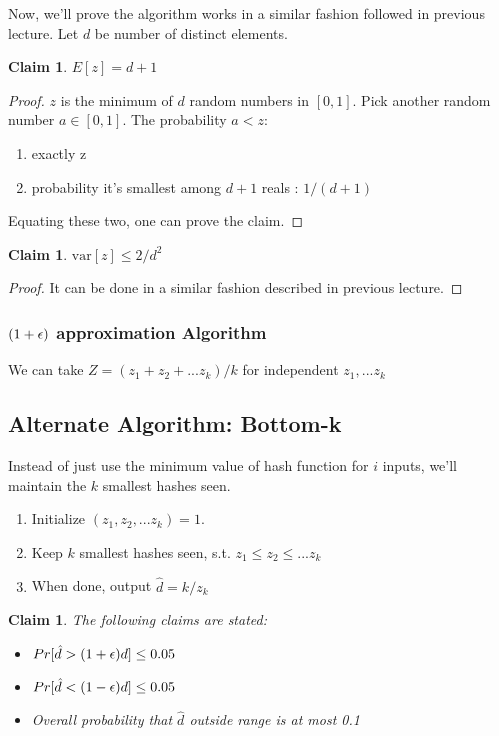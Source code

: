 \documentclass[11pt]{article}
\newtheorem{claim}[theorem]{Claim}
\def\eps{\ensuremath\epsilon}
\begin{document}
Now, we'll prove the algorithm works in a similar fashion followed in previous lecture.
Let $d$ be number of distinct elements.

\begin{claim}
$E[z] = d+1$
\end{claim}

\begin{proof}
$z$ is the minimum of $d$ random numbers in $[0,1]$. Pick another random number $a \in [0,1]$. The probability $a<z$:
\begin{enumerate}
\item exactly z
\item probability it's smallest among $d+1$ reals : $1/(d+1)$
\end{enumerate}
Equating these two, one can prove the claim.
\end{proof}

\begin{claim}
$\text{var}[z] \leq 2/d^{2}$
\end{claim}

\begin{proof}
It can be done in a similar fashion described in previous lecture.
\end{proof}

\subsubsection{$(1+\eps)$ approximation Algorithm }
We can take $Z = (z_{1} + z_{2} + ... z_{k})/k$ for independent $z_{1}, ... z_{k}$

\subsection{Alternate Algorithm: Bottom-k}
Instead of just use the minimum value of hash function for $i$ inputs, we'll maintain the $k$ smallest hashes seen.
\begin{enumerate}
\item Initialize $(z_{1}, z_{2},...z_{k}) = 1$.
\item Keep $k$ smallest hashes seen, s.t. $z_{1}\leq z_{2}\leq...z_{k}$
\item When done, output $\hat{d} = k/z_{k}$
\end{enumerate}

\begin{claim}
The following claims are stated:
\begin{itemize}
\item $Pr[\hat{d} > (1 + \eps)d] \leq 0.05$
\item $Pr[\hat{d} < (1 - \eps)d] \leq 0.05$
\item Overall probability that $\hat{d}$ outside range is at most 0.1
\end{itemize}
\end{claim}
\end{document}
